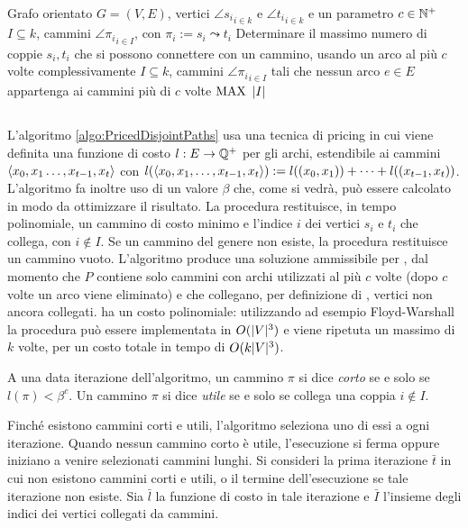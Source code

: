 \popt{\DisjointPaths}
{Grafo orientato $G=(V,E)$, vertici $\angle{s_i}_{i\in k}$ e $\angle{t_i}_{i\in k}$ e un parametro $c\in\mathbb N^+$}
{$I\subseteq k$, cammini $\angle{\pi_i}_{i\in I}$, con $\pi_i:=s_i\leadsto t_i$}
{Determinare il massimo numero di coppie $s_i,t_i$ che si possono connettere con un cammino, usando un arco al più $c$ volte complessivamente}
{$I\subseteq k$, cammini $\angle{\pi_i}_{i\in I}$ tali che nessun arco $e\in E$ appartenga ai cammini più di $c$ volte}
{$\mathrm{MAX}$}
{$| I |$}


\subsection{\PricedDisjointPaths}
L'algoritmo \ref{algo:PricedDisjointPaths} usa una tecnica di pricing in cui viene definita una funzione di costo $l:E\to\mathbb Q^+$ per gli archi, estendibile ai cammini $\langle x_0,x_1\dots,x_{t-1},x_t \rangle$ con $l(\langle x_0,x_1,\dots,x_{t-1},x_t \rangle):=l((x_0,x_1))+\dots+l((x_{t-1},x_t))$.
L'algoritmo fa inoltre uso di un valore $\beta$ che, come si vedrà, può essere calcolato in modo da ottimizzare il risultato.
La procedura \MinPath restituisce, in tempo polinomiale, un cammino di costo minimo e l'indice $i$ dei vertici $s_i$ e $t_i$ che collega, con $i\notin I$. Se un cammino del genere non esiste, la procedura restituisce un cammino vuoto.
L'algoritmo produce una soluzione ammissibile per \DisjointPaths, dal momento che $P$ contiene solo cammini con archi utilizzati al più $c$ volte (dopo $c$ volte un arco viene eliminato) e che collegano, per definizione di \MinPath, vertici non ancora collegati.
\PricedDisjointPaths ha un costo polinomiale: utilizzando ad esempio Floyd-Warshall la procedura \MinPath può essere implementata in $O(| V |^3)$ e viene ripetuta un massimo di $k$ volte, per un costo totale in tempo di $O(k| V |^3)$.

\begin{algorithm}
	\caption{\PricedDisjointPaths}
	\label{algo:PricedDisjointPaths}
	
\end{algorithm}

A una data iterazione dell'algoritmo, un cammino $\pi$ si dice \emph{corto} se e solo se $l(\pi)<\beta^c$.
Un cammino $\pi$ si dice \emph{utile} se e solo se collega una coppia $i\notin I$.

Finché esistono cammini corti e utili, l'algoritmo seleziona uno di essi a ogni iterazione.
Quando nessun cammino corto è utile, l'esecuzione si ferma oppure iniziano a venire selezionati cammini lunghi.
Si consideri la prima iterazione $\bar t$ in cui non esistono cammini corti e utili, o il termine dell'esecuzione se tale iterazione non esiste.
Sia $\bar l$ la funzione di costo in tale iterazione e $\bar I$ l'insieme degli indici dei vertici collegati da cammini.

